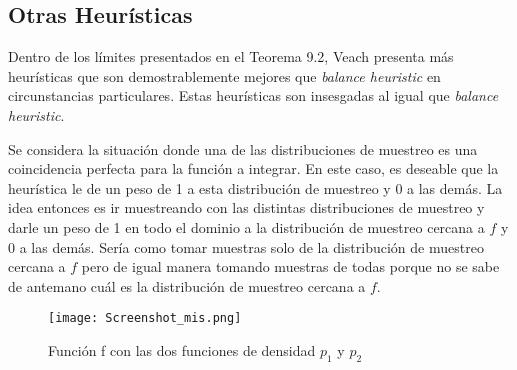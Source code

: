 \documentclass{article}
\begin{document}





\subsection{Otras Heurísticas}

Dentro de los límites presentados en el Teorema 9.2, Veach presenta más heurísticas que son demostrablemente mejores que \textit{balance heuristic} en circunstancias particulares.
Estas heurísticas son insesgadas al igual que \textit{balance heuristic}.

Se considera la situación donde una de las distribuciones de muestreo es una coincidencia perfecta para la función a integrar. En este caso, es deseable que la heurística le de un peso de 1 a esta distribución de muestreo y 0 a las demás.
La idea entonces es ir muestreando con las distintas distribuciones de muestreo y darle un peso de 1 en todo el dominio a la distribución de muestreo cercana a $f$ y 0 a las demás.
Sería como tomar muestras solo de la distribución de muestreo cercana a $f$ pero de igual manera tomando muestras de todas porque no se sabe de antemano cuál es la distribución de muestreo cercana a $f$.

\begin{figure}[H]
\centering
\texttt{[image: Screenshot\_mis.png]}
\caption{Función f con las dos funciones de densidad $p_{1}$ y $p_{2}$}
\label{fig:misother}
\end{figure}
\end{document}
